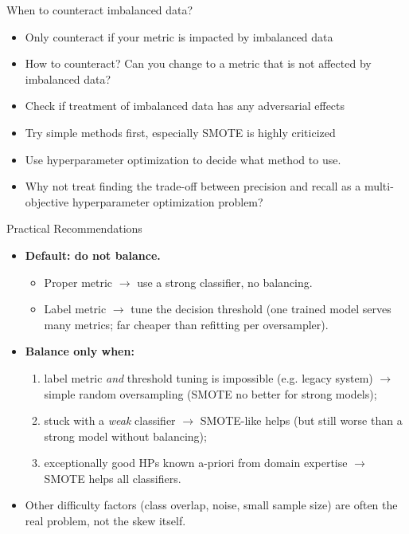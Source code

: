 \documentclass[11pt,compress,t,notes=noshow, xcolor=table]{beamer}
\begin{document}
\begin{frame}{When to counteract imbalanced data?}
\begin{itemize}
    \item Only counteract if your metric is impacted by imbalanced data
    \item How to counteract? Can you change to a metric that is not affected by imbalanced data?
    \item Check if treatment of imbalanced data has any adversarial effects 
    \item Try simple methods first, especially SMOTE is highly criticized 
    \item Use hyperparameter optimization to decide what method to use.
    \item Why not treat finding the trade-off between precision and recall as a multi-objective hyperparameter optimization problem?
\end{itemize}
    
\end{frame}

\begin{frame}{Practical Recommendations }
    \small
    \begin{itemize}
        \item \textbf{Default: do not balance.}
        \begin{itemize}
            \footnotesize
            \item Proper metric $\to$ use a strong classifier, no balancing.
            \item Label metric $\to$ tune the decision threshold (one trained model serves many metrics; far cheaper than refitting per oversampler).
        \end{itemize}
        \item \textbf{Balance only when:}
        \begin{enumerate}
            \footnotesize
            \item label metric \emph{and} threshold tuning is impossible (e.g. legacy system) $\to$ simple random oversampling (SMOTE no better for strong models);
            \item stuck with a \emph{weak} classifier $\to$ SMOTE-like helps (but still worse than a strong model without balancing);
            \item exceptionally good HPs known a-priori from domain expertise $\to$ SMOTE helps all classifiers.
        \end{enumerate}
        \item Other difficulty factors (class overlap, noise, small sample size) are often the real problem, not the skew itself.
    \end{itemize}
\end{frame}


\endlecture
\end{document}
